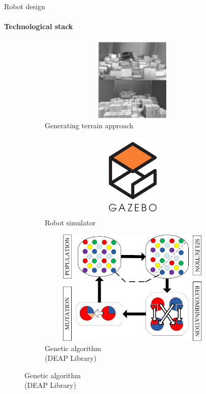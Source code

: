 \documentclass[aspectratio=169]{beamer}
\begin{document}
\begin{frame}[c]{Robot design}
    \framesubtitle{Technological stack}
    \vspace{-1.2cm}
    \begin{figure}[H]
        \begin{subfigure}{0.32\textwidth}
            \centering\includegraphics[height=4cm,width=1\textwidth,keepaspectratio]{c1_paper.png}
            \caption*{Generating terrain approach}
        \end{subfigure}
        \hfill
        \begin{subfigure}{0.32\textwidth}
            \centering\includegraphics[height=4cm,width=1\textwidth,keepaspectratio]{gazebo_logo.png}
            \caption*{Robot simulator}
        \end{subfigure}
        \hfill
        \begin{subfigure}{0.32\textwidth}
            \centering\includegraphics[height=5.5cm,width=1\textwidth,keepaspectratio]{gen_algo.jpg}
            \caption*{Genetic algorithm \\ (DEAP Library)}
        \end{subfigure}
        \hfill
    \end{figure}
\end{frame}
\end{document}
